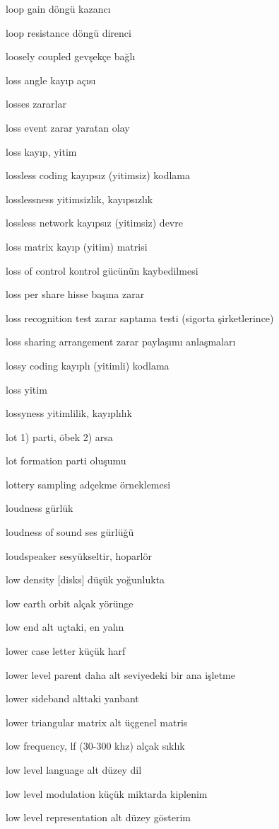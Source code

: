\documentclass[12pt,fleqn]{article}\usepackage{../../common}
\begin{document}
loop gain döngü kazancı

loop resistance döngü direnci

loosely coupled gevşekçe bağlı

loss angle kayıp açısı

losses zararlar

loss event zarar yaratan olay

loss kayıp, yitim

lossless coding kayıpsız (yitimsiz) kodlama

losslessness yitimsizlik, kayıpsızlık

lossless network kayıpsız (yitimsiz) devre

loss matrix kayıp (yitim) matrisi

loss of control kontrol gücünün kaybedilmesi

loss per share hisse başına zarar

loss recognition test zarar saptama testi (sigorta şirketlerince)

loss sharing arrangement zarar paylaşımı anlaşmaları

lossy coding kayıplı (yitimli) kodlama

loss yitim

lossyness yitimlilik, kayıplılık

lot 1) parti, öbek 2) arsa

lot formation parti oluşumu

lottery sampling adçekme örneklemesi

loudness gürlük

loudness of sound ses gürlüğü

loudspeaker sesyükseltir, hoparlör

low density [disks] düşük yoğunlukta

low earth orbit alçak yörünge

low end alt uçtaki, en yalın

lower case letter küçük harf

lower level parent daha alt seviyedeki bir ana işletme

lower sideband alttaki yanbant

lower triangular matrix alt üçgenel matris

low frequency, lf (30-300 khz) alçak sıklık

low level language alt düzey dil

low level modulation küçük miktarda kiplenim

low level representation alt düzey gösterim
\end{document}
